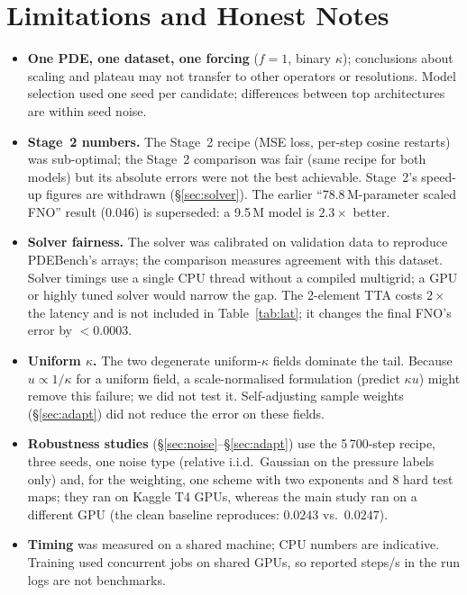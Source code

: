 \documentclass[11pt,a4paper]{article}
\begin{document}
\section{Limitations and Honest Notes}
\begin{itemize}
\item \textbf{One PDE, one dataset, one forcing} ($f=1$, binary $\kappa$); conclusions about scaling and plateau may not transfer to other operators or resolutions. Model selection used one seed per candidate; differences between top architectures are within seed noise.
\item \textbf{Stage~2 numbers.} The Stage~2 recipe (MSE loss, per-step cosine restarts) was sub-optimal; the Stage~2 comparison was fair (same recipe for both models) but its absolute errors were not the best achievable. Stage~2's speed-up figures are withdrawn (\S\ref{sec:solver}). The earlier ``78.8\,M-parameter scaled FNO'' result (0.046) is superseded: a 9.5\,M model is $2.3\times$ better.
\item \textbf{Solver fairness.} The solver was calibrated on validation data to reproduce PDEBench's arrays; the comparison measures agreement with this dataset. Solver timings use a single CPU thread without a compiled multigrid; a GPU or highly tuned solver would narrow the gap. The 2-element TTA costs $2\times$ the latency and is not included in Table~\ref{tab:lat}; it changes the final FNO's error by $<0.0003$.
\item \textbf{Uniform $\kappa$.} The two degenerate uniform-$\kappa$ fields dominate the tail. Because $u\propto1/\kappa$ for a uniform field, a scale-normalised formulation (predict $\kappa u$) might remove this failure; we did not test it. Self-adjusting sample weights (\S\ref{sec:adapt}) did not reduce the error on these fields.
\item \textbf{Robustness studies} (\S\ref{sec:noise}--\S\ref{sec:adapt}) use the 5\,700-step recipe, three seeds, one noise type (relative i.i.d.\ Gaussian on the pressure labels only) and, for the weighting, one scheme with two exponents and 8 hard test maps; they ran on Kaggle T4 GPUs, whereas the main study ran on a different GPU (the clean baseline reproduces: $0.0243$ vs.\ $0.0247$).
\item \textbf{Timing} was measured on a shared machine; CPU numbers are indicative. Training used concurrent jobs on shared GPUs, so reported steps/s in the run logs are not benchmarks.
\end{itemize}
\end{document}
